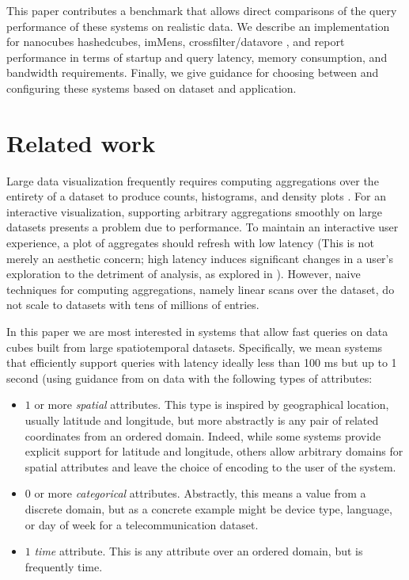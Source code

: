 \documentclass[journal]{vgtc}                %
\begin{document}
This paper contributes a benchmark that allows direct comparisons of the query
performance of these systems on realistic data. We describe an implementation
for nanocubes hashedcubes, imMens, crossfilter/datavore , and report
performance in terms of startup and query latency, memory consumption, and
bandwidth requirements. Finally, we give guidance for choosing between and
configuring these systems based on dataset and application.


\section{Related work}

Large data visualization frequently requires computing aggregations over the
entirety of a dataset to produce counts, histograms, and density plots
\cite{?}. For an interactive visualization, supporting arbitrary aggregations
smoothly on large datasets presents a problem due to performance. To maintain
an interactive user experience, a plot of aggregates should refresh with low
latency (This is not merely an aesthetic concern; high latency induces significant
changes in a user's exploration to the detriment of analysis, as explored in
\cite{2014-latency}). However, naive techniques for computing aggregations, namely linear scans over the dataset, do not scale
to datasets with tens of millions of entries.

In this paper we are most interested in systems that allow fast queries on data cubes built from large spatiotemporal datasets. Specifically, we mean systems that efficiently support queries with latency ideally less than 100 ms but up to 1 second (using guidance from \cite{2014-latency} on data with the following types of attributes:

\begin{itemize}
	\item $1$ or more \textit{spatial} attributes. This type is inspired by geographical location, usually latitude and longitude, but more abstractly is any pair of related coordinates from an ordered domain. Indeed, while some systems provide explicit support for latitude and longitude, others allow arbitrary domains for spatial attributes and leave the choice of encoding to the user of the system.
	\item $0$ or more \textit{categorical} attributes. Abstractly, this means a value from a discrete domain, but as a concrete example might be device type, language, or day of week for a telecommunication dataset.
	\item $1$ \textit{time} attribute. This is any attribute over an ordered domain, but is frequently time.
\end{itemize}
\end{document}
